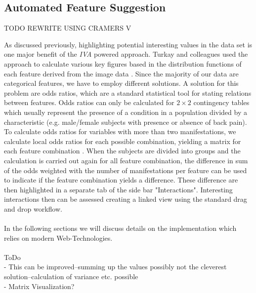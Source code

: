 \documentclass[journal]{style/vgtc} 			          %
\begin{document}
\subsection{Automated Feature Suggestion}
TODO REWRITE USING CRAMERS V

As discussed previously, highlighting potential interesting values in the data set is one major benefit of the \emph{IVA} powered approach.
%
Turkay and colleagues used the approach to calculate various key figures based in the distribution functions of each feature derived from the image data \cite{Turkay2013}.
%
Since the majority of our data are categorical features, we have to employ different solutions.
%
A solution for this problem are odds ratios, which are a standard statistical tool for stating relations between features.
%
Odds ratios can only be calculated for $2\times2$ contingency tables which usually represent the presence of a condition in a population divided by a characteristic (e.g. male/female subjects with presence or absence of back pain).
%
To calculate odds ratios for variables with more than two manifestations, we calculate local odds ratios for each possible combination, yielding a matrix for each feature combination \cite{Rudas1998}.
%
When the subjects are divided into groups and the calculation is carried out again for all feature combination, the difference in sum of the odds weighted with the number of manifestations per feature can be used to indicate if the feature combination yields a difference.
%
These difference are then highlighted in a separate tab of the side bar "Interactions".
%
Interesting interactions then can be assessed creating a linked view using the standard drag and drop workflow.
\\\\
In the following sections we will discuss details on the implementation which relies on modern Web-Technologies.
\\\\
ToDo\\
- This can be improved--summing up the values possibly not the cleverest solution--calculation of variance etc. possible\\
- Matrix Visualization?
\end{document}
